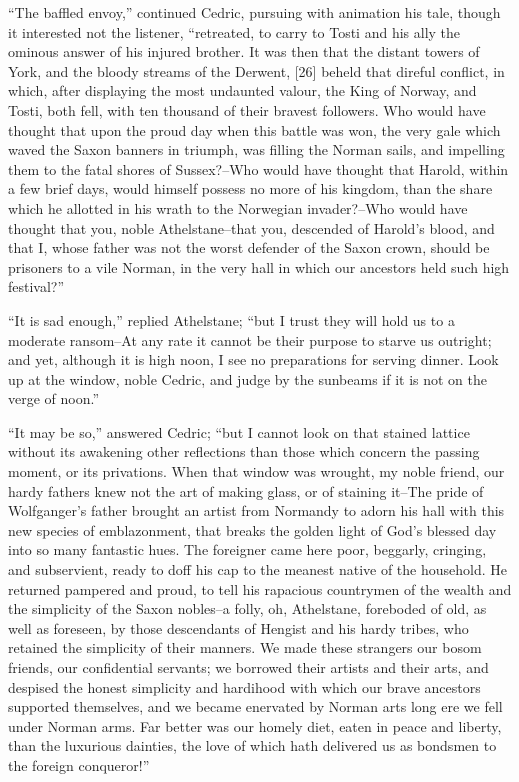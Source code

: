 ``The baffled envoy,'' continued Cedric, pursuing with animation his
tale, though it interested not the listener, ``retreated, to carry to
Tosti and his ally the ominous answer of his injured brother. It was
then that the distant towers of York, and the bloody streams of the
Derwent, {[}26{]} beheld that direful conflict, in which, after
displaying the most undaunted valour, the King of Norway, and Tosti,
both fell, with ten thousand of their bravest followers. Who would have
thought that upon the proud day when this battle was won, the very gale
which waved the Saxon banners in triumph, was filling the Norman sails,
and impelling them to the fatal shores of Sussex?--Who would have
thought that Harold, within a few brief days, would himself possess no
more of his kingdom, than the share which he allotted in his wrath to
the Norwegian invader?--Who would have thought that you, noble
Athelstane--that you, descended of Harold's blood, and that I, whose
father was not the worst defender of the Saxon crown, should be
prisoners to a vile Norman, in the very hall in which our ancestors held
such high festival?''

``It is sad enough,'' replied Athelstane; ``but I trust they will hold
us to a moderate ransom--At any rate it cannot be their purpose to
starve us outright; and yet, although it is high noon, I see no
preparations for serving dinner. Look up at the window, noble Cedric,
and judge by the sunbeams if it is not on the verge of noon.''

``It may be so,'' answered Cedric; ``but I cannot look on that stained
lattice without its awakening other reflections than those which concern
the passing moment, or its privations. When that window was wrought, my
noble friend, our hardy fathers knew not the art of making glass, or of
staining it--The pride of Wolfganger's father brought an artist from
Normandy to adorn his hall with this new species of emblazonment, that
breaks the golden light of God's blessed day into so many fantastic
hues. The foreigner came here poor, beggarly, cringing, and subservient,
ready to doff his cap to the meanest native of the household. He
returned pampered and proud, to tell his rapacious countrymen of the
wealth and the simplicity of the Saxon nobles--a folly, oh, Athelstane,
foreboded of old, as well as foreseen, by those descendants of Hengist
and his hardy tribes, who retained the simplicity of their manners. We
made these strangers our bosom friends, our confidential servants; we
borrowed their artists and their arts, and despised the honest
simplicity and hardihood with which our brave ancestors supported
themselves, and we became enervated by Norman arts long ere we fell
under Norman arms. Far better was our homely diet, eaten in peace and
liberty, than the luxurious dainties, the love of which hath delivered
us as bondsmen to the foreign conqueror!''

